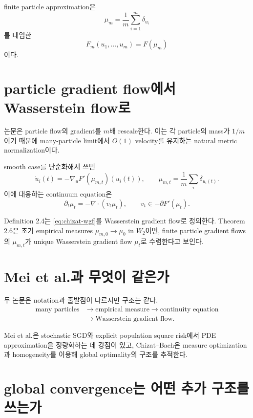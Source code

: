 \documentclass[11pt,a4paper,oneside,openany]{memoir}
\newcommand{\grad}{\nabla}
\newcommand{\diver}{\nabla\!\cdot}
\theoremstyle{definition}
\begin{document}
finite particle approximation은
\[
  \mu_m=\frac1m\sum_{i=1}^{m}\delta_{u_i}
\]
를 대입한
\[
  F_m(u_1,\ldots,u_m)=F(\mu_m)
\]
이다.

\section{particle gradient flow에서 Wasserstein flow로}

논문은 particle flow의 gradient를 $m$배 rescale한다.
이는 각 particle의 mass가 $1/m$이기 때문에 many-particle limit에서 $O(1)$ velocity를 유지하는
natural metric normalization이다.

smooth case를 단순화해서 쓰면
\[
  \dot u_i(t)=-\grad_u F'(\mu_{m,t})(u_i(t)),
  \qquad
  \mu_{m,t}=\frac1m\sum_i\delta_{u_i(t)}.
\]
이에 대응하는 continuum equation은
\begin{equation}
  \partial_t\mu_t
  =-\diver(v_t\mu_t),
  \qquad
  v_t\in-\partial F'(\mu_t).
\label{eq:chizat-wgf}
\end{equation}

\begin{paperbox}
Definition 2.4는 \eqref{eq:chizat-wgf}를 Wasserstein gradient flow로 정의한다.
Theorem 2.6은 초기 empirical measures $\mu_{m,0}\to\mu_0$ in $W_2$이면,
finite particle gradient flows의 $\mu_{m,t}$가 unique Wasserstein gradient flow $\mu_t$로 수렴한다고 보인다.
\end{paperbox}

\section{Mei et al.과 무엇이 같은가}

두 논문은 notation과 출발점이 다르지만 구조는 같다.
\[
\begin{aligned}
\text{many particles}
&\longrightarrow \text{empirical measure}
\longrightarrow \text{continuity equation}\\
&\longrightarrow \text{Wasserstein gradient flow}.
\end{aligned}
\]

Mei et al.은 stochastic SGD와 explicit population square risk에서 PDE approximation을 정량화하는 데
강점이 있고, Chizat--Bach은 measure optimization과 homogeneity를 이용해 global optimality의 구조를
추적한다.

\section{global convergence는 어떤 추가 구조를 쓰는가}
\end{document}
